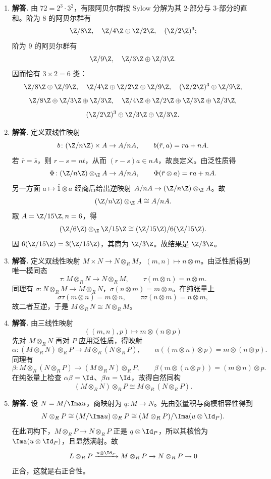 \begin{enumerate}[label=\textbf{\arabic*.}, leftmargin=*, itemsep=1em]
  \item \textbf{解答.} 由 $72=2^3\cdot 3^2$，有限阿贝尔群按 Sylow 分解为其 $2$-部分与 $3$-部分的直和。阶为 $8$ 的阿贝尔群有
  \[
  \Z/8\Z,\quad \Z/4\Z\oplus \Z/2\Z,\quad (\Z/2\Z)^3;
  \]
  阶为 $9$ 的阿贝尔群有
  \[
  \Z/9\Z,\quad \Z/3\Z\oplus \Z/3\Z.
  \]
  因而恰有 $3\times 2=6$ 类：
  \[
  \Z/8\Z\oplus \Z/9\Z,\quad \Z/4\Z\oplus \Z/2\Z\oplus \Z/9\Z,\quad (\Z/2\Z)^3\oplus \Z/9\Z,
  \]
  \[
  \Z/8\Z\oplus \Z/3\Z\oplus \Z/3\Z,\quad \Z/4\Z\oplus \Z/2\Z\oplus \Z/3\Z\oplus \Z/3\Z,
  \]
  \[
  (\Z/2\Z)^3\oplus \Z/3\Z\oplus \Z/3\Z.
  \]

  \item \textbf{解答.} 定义双线性映射
  \[
  b\colon (\Z/n\Z)\times A\to A/nA,\qquad b(\bar r,a)=ra+nA.
  \]
  若 $\bar r=\bar s$，则 $r-s=nt$，从而 $(r-s)a\in nA$，故良定义。由泛性质得
  \[
  \Phi\colon (\Z/n\Z)\otimes_\Z A\to A/nA,
  \qquad \Phi(\bar r\otimes a)=ra+nA.
  \]
  另一方面 $a\mapsto \bar 1\otimes a$ 经商后给出逆映射 $A/nA\to (\Z/n\Z)\otimes_\Z A$。故
  \[
  (\Z/n\Z)\otimes_\Z A\cong A/nA.
  \]
  取 $A=\Z/15\Z,n=6$，得
  \[
  (\Z/6\Z)\otimes_\Z \Z/15\Z\cong (\Z/15\Z)/6(\Z/15\Z).
  \]
  因 $6(\Z/15\Z)=3(\Z/15\Z)$，其商为 $\Z/3\Z$。故结果是 $\Z/3\Z$。

  \item \textbf{解答.} 定义双线性映射 $M\times N\to N\otimes_R M$，$(m,n)\mapsto n\otimes m$。由泛性质得到唯一模同态
  \[
  \tau\colon M\otimes_R N\to N\otimes_R M,
  \qquad \tau(m\otimes n)=n\otimes m.
  \]
  同理有 $\sigma\colon N\otimes_R M\to M\otimes_R N$，$\sigma(n\otimes m)=m\otimes n$。在纯张量上
  \[
  \sigma\tau(m\otimes n)=m\otimes n,\qquad \tau\sigma(n\otimes m)=n\otimes m,
  \]
  故二者互逆，于是 $M\otimes_R N\cong N\otimes_R M$。

  \item \textbf{解答.} 由三线性映射
  \[
  ((m,n),p)\longmapsto m\otimes(n\otimes p)
  \]
  先对 $M\otimes_R N$ 再对 $P$ 应用泛性质，得映射
  \[
  \alpha\colon (M\otimes_R N)\otimes_R P\to M\otimes_R (N\otimes_R P),
  \qquad \alpha((m\otimes n)\otimes p)=m\otimes(n\otimes p).
  \]
  同理有
  \[
  \beta\colon M\otimes_R (N\otimes_R P)\to (M\otimes_R N)\otimes_R P,
  \qquad \beta(m\otimes(n\otimes p))=(m\otimes n)\otimes p.
  \]
  在纯张量上检查 $\alpha\beta=\Id$、$\beta\alpha=\Id$，故得自然同构
  \[
  (M\otimes_R N)\otimes_R P\cong M\otimes_R(N\otimes_R P).
  \]

  \item \textbf{解答.} 设 $N=M/\Ima u$，商映射为 $q\colon M\to N$。先由张量积与商模相容性得到
  \[
  N\otimes_R P\cong (M/\Ima u)\otimes_R P\cong (M\otimes_R P)/\Ima(u\otimes \Id_P).
  \]
  在此同构下，$M\otimes_R P\to N\otimes_R P$ 正是 $q\otimes \Id_P$，所以其核恰为 $\Ima(u\otimes \Id_P)$，且显然满射。故
  \[
  L\otimes_R P\xrightarrow{u\otimes \Id_P}M\otimes_R P\xrightarrow{}N\otimes_R P\to 0
  \]
  正合，这就是右正合性。


\end{enumerate}
